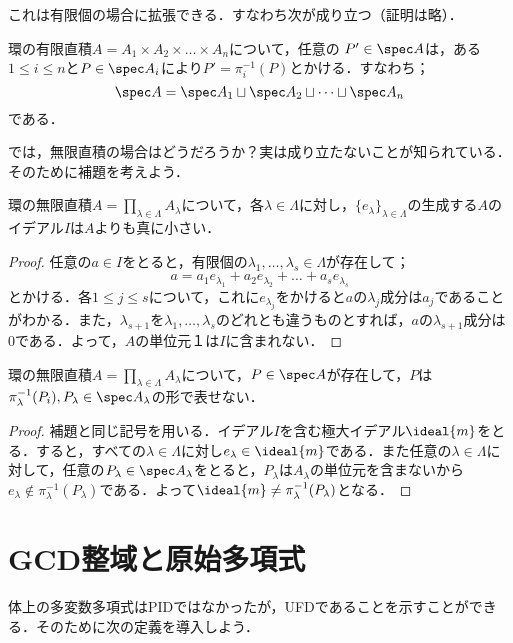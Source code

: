 これは有限個の場合に拡張できる．すなわち次が成り立つ（証明は略）．

\begin{prop}
	環の有限直積$A=A_1\times A_2\times\dots\times A_n$について，任意の $P'\in\spec A$は，ある$1\leq i\leq n$と$P\in\spec A_i$により$P'=\pi_i^{-1}(P)$とかける．すなわち；
	\[\spec A=\spec A_1\sqcup\spec A_2\sqcup\dots\sqcup\spec A_n\]
	である．
\end{prop}

では，無限直積の場合はどうだろうか？実は成り立たないことが知られている．そのために補題を考えよう．

\begin{lem}
	環の無限直積$A=\prod_{\lambda\in\Lambda}A_\lambda$について，各$\lambda\in \Lambda$に対し，$\{e_\lambda\}_{\lambda\in\Lambda}$の生成する$A$のイデアル$I$は$A$よりも真に小さい．
\end{lem}

\begin{proof}
	任意の$a\in I$をとると，有限個の$\lambda_1,\dots,\lambda_s\in \Lambda$が存在して；
	\[a=a_1e_{\lambda_1}+a_2e_{\lambda_2}+\dots+a_se_{\lambda_s}\]
	とかける．各$1\leq j\leq s$について，これに$e_{\lambda_j}$をかけると$a$の$\lambda_j$成分は$a_j$であることがわかる．また，$\lambda_{s+1}$を$\lambda_1,\dots,\lambda_s$のどれとも違うものとすれば，$a$の$\lambda_{s+1}$成分は0である．よって，$A$の単位元$１$は$I$に含まれない．
\end{proof}

\begin{prop}
	環の無限直積$A=\prod_{\lambda\in \Lambda}A_\lambda$について，$P\in\spec A$が存在して，$P$は$\pi^{-1}_\lambda(P_i),P_\lambda\in\spec A_\lambda$の形で表せない．
\end{prop}

\begin{proof}
	補題と同じ記号を用いる．イデアル$I$を含む極大イデアル$\ideal{m}$をとる．すると，すべての$\lambda\in \Lambda$に対し$e_\lambda\in\ideal{m}$である．また任意の$\lambda\in \Lambda$に対して，任意の$P_\lambda\in\spec A_\lambda$をとると，$P_\lambda$は$A_\lambda$の単位元を含まないから$e_\lambda\not\in\pi^{-1}_\lambda(P_\lambda)$である．よって$\ideal{m}\neq\pi_\lambda^{-1}(P_\lambda)$となる．
\end{proof}

\section{GCD整域と原始多項式}
体上の多変数多項式はPIDではなかったが，UFDであることを示すことができる．そのために次の定義を導入しよう．

